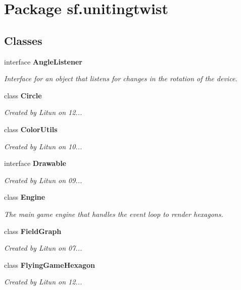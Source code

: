 \section{Package sf.\+unitingtwist}
\label{namespacesf_1_1unitingtwist}
\subsection*{Classes}
\begin{DoxyCompactItemize}
\item 
interface \textbf{ Angle\+Listener}
\begin{DoxyCompactList}\small\item\em Interface for an object that listens for changes in the rotation of the device. \end{DoxyCompactList}\item 
class \textbf{ Circle}
\begin{DoxyCompactList}\small\item\em Created by Litun on 12... \end{DoxyCompactList}\item 
class \textbf{ Color\+Utils}
\begin{DoxyCompactList}\small\item\em Created by Litun on 10... \end{DoxyCompactList}\item 
interface \textbf{ Drawable}
\begin{DoxyCompactList}\small\item\em Created by Litun on 09... \end{DoxyCompactList}\item 
class \textbf{ Engine}
\begin{DoxyCompactList}\small\item\em The main game engine that handles the event loop to render hexagons. \end{DoxyCompactList}\item 
class \textbf{ Field\+Graph}
\begin{DoxyCompactList}\small\item\em Created by Litun on 07... \end{DoxyCompactList}\item 
class \textbf{ Flying\+Game\+Hexagon}
\begin{DoxyCompactList}\small\item\em Created by Litun on 12... \end{DoxyCompactList}\item 

\end{DoxyCompactItemize}
